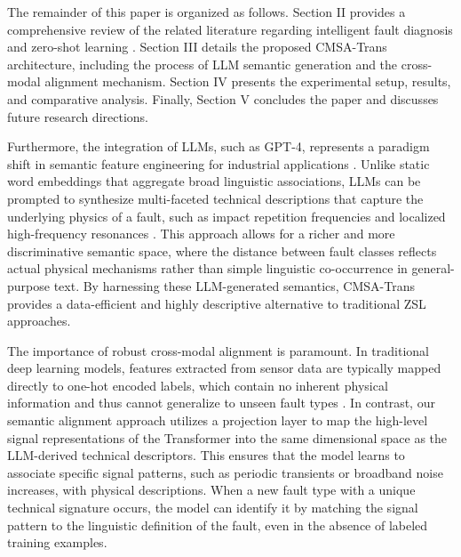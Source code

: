 \documentclass[journal]{IEEEtran}
\begin{document}
The remainder of this paper is organized as follows. Section II provides a comprehensive review of the related literature regarding intelligent fault diagnosis and zero-shot learning \cite{li2022zero}. Section III details the proposed CMSA-Trans architecture, including the process of LLM semantic generation and the cross-modal alignment mechanism. Section IV presents the experimental setup, results, and comparative analysis. Finally, Section V concludes the paper and discusses future research directions.

Furthermore, the integration of LLMs, such as GPT-4, represents a paradigm shift in semantic feature engineering for industrial applications \cite{bubeck2023sparks}. Unlike static word embeddings that aggregate broad linguistic associations, LLMs can be prompted to synthesize multi-faceted technical descriptions that capture the underlying physics of a fault, such as impact repetition frequencies and localized high-frequency resonances \cite{brown2020language}. This approach allows for a richer and more discriminative semantic space, where the distance between fault classes reflects actual physical mechanisms rather than simple linguistic co-occurrence in general-purpose text. By harnessing these LLM-generated semantics, CMSA-Trans provides a data-efficient and highly descriptive alternative to traditional ZSL approaches.

The importance of robust cross-modal alignment is paramount. In traditional deep learning models, features extracted from sensor data are typically mapped directly to one-hot encoded labels, which contain no inherent physical information and thus cannot generalize to unseen fault types \cite{goodfellow2016deep, lecun2015deep}. In contrast, our semantic alignment approach utilizes a projection layer to map the high-level signal representations of the Transformer into the same dimensional space as the LLM-derived technical descriptors. This ensures that the model learns to associate specific signal patterns, such as periodic transients or broadband noise increases, with physical descriptions. When a new fault type with a unique technical signature occurs, the model can identify it by matching the signal pattern to the linguistic definition of the fault, even in the absence of labeled training examples.
\end{document}
